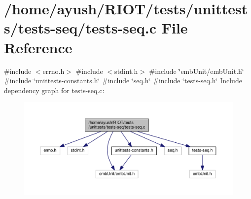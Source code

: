 \hypertarget{tests-seq_8c}{}\section{/home/ayush/\+R\+I\+O\+T/tests/unittests/tests-\/seq/tests-\/seq.c File Reference}
\label{tests-seq_8c}
{\ttfamily \#include $<$errno.\+h$>$}\newline
{\ttfamily \#include $<$stdint.\+h$>$}\newline
{\ttfamily \#include \char`\"{}emb\+Unit/emb\+Unit.\+h\char`\"{}}\newline
{\ttfamily \#include \char`\"{}unittests-\/constants.\+h\char`\"{}}\newline
{\ttfamily \#include \char`\"{}seq.\+h\char`\"{}}\newline
{\ttfamily \#include \char`\"{}tests-\/seq.\+h\char`\"{}}\newline
Include dependency graph for tests-\/seq.c\+:
\nopagebreak
\begin{figure}[H]
\begin{center}
\leavevmode
\includegraphics[width=350pt]{tests-seq_8c__incl}
\end{center}
\end{figure}
